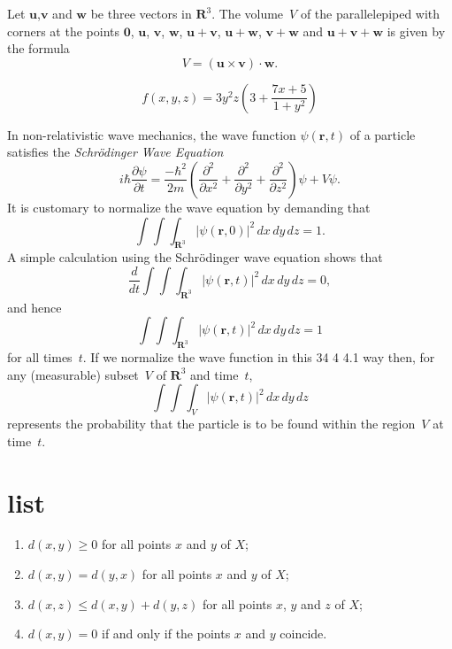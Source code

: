 Let $\mathbf{u}$,$\mathbf{v}$ and $\mathbf{w}$ be three
vectors in ${\mathbf R}^3$. The volume~$V$ of the
parallelepiped with corners at the points
$\mathbf{0}$, $\mathbf{u}$, $\mathbf{v}$,
$\mathbf{w}$, $\mathbf{u}+\mathbf{v}$,
$\mathbf{u}+\mathbf{w}$, $\mathbf{v}+\mathbf{w}$
and $\mathbf{u}+\mathbf{v}+\mathbf{w}$
is given by the formula
\[ V = (\mathbf{u} \times \mathbf{v}) \cdot \mathbf{w}.\]

\begin{equation}
f(x,y,z) = 3y^2 z \left( 3 + \frac{7x+5}{1 + y^2} \right)
\end{equation}


In non-relativistic wave mechanics, the wave function
     $\psi(\mathbf{r},t)$ of a particle satisfies the
     \textit{Schr\"{o}dinger Wave Equation}
     \[ i\hbar\frac{\partial \psi}{\partial t}
       = \frac{-\hbar^2}{2m} \left(
         \frac{\partial^2}{\partial x^2}
         + \frac{\partial^2}{\partial y^2}
         + \frac{\partial^2}{\partial z^2}
       \right) \psi + V \psi.\]
     It is customary to normalize the wave equation by
     demanding that
     \[ \int \!\!\! \int \!\!\! \int_{\textbf{R}^3}
           \left| \psi(\mathbf{r},0) \right|^2\,dx\,dy\,dz = 1.\]
     A simple calculation using the Schr\"{o}dinger wave
     equation shows that
     \[ \frac{d}{dt} \int \!\!\! \int \!\!\! \int_{\textbf{R}^3}
           \left| \psi(\mathbf{r},t) \right|^2\,dx\,dy\,dz = 0,\]
     and hence
     \[ \int \!\!\! \int \!\!\! \int_{\textbf{R}^3}
           \left| \psi(\mathbf{r},t) \right|^2\,dx\,dy\,dz = 1\]
     for all times~$t$. If we normalize the wave function in this
34
4 4.1
way then, for any (measurable) subset~$V$ of $\textbf{R}^3$
and time~$t$,
\[ \int \!\!\! \int \!\!\! \int_V
      \left| \psi(\mathbf{r},t) \right|^2\,dx\,dy\,dz\]
represents the probability that the particle is to be found
within the region~$V$ at time~$t$.

\section{list}

\begin{enumerate}
\item
$d(x,y) \geq 0$ for all points $x$ and $y$ of $X$;
\item
$d(x,y) = d(y,x)$ for all points $x$ and $y$ of $X$;
\item
$d(x,z) \leq d(x,y) + d(y,z)$ for all points $x$, $y$
and $z$ of $X$;
\item
$d(x,y) = 0$ if and only if the points $x$ and $y$
coincide.
\end{enumerate}

